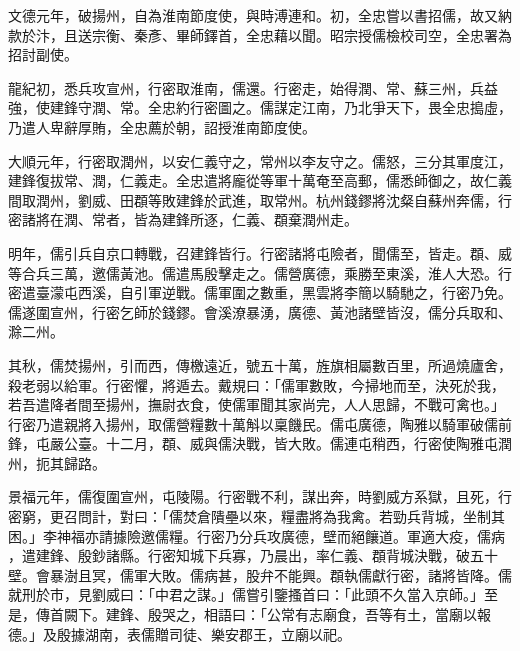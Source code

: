 \begin{pinyinscope}
 文德元年，破揚州，自為淮南節度使，與時溥連和。初，全忠嘗以書招儒，故又納款於汴，且送宗衡、秦彥、畢師鐸首，全忠藉以聞。昭宗授儒檢校司空，全忠署為招討副使。



 龍紀初，悉兵攻宣州，行密取淮南，儒還。行密走，始得潤、常、蘇三州，兵益強，使建鋒守潤、常。全忠約行密圖之。儒謀定江南，乃北爭天下，畏全忠搗虛，乃遣人卑辭厚賄，全忠薦於朝，詔授淮南節度使。



 大順元年，行密取潤州，以安仁義守之，常州以李友守之。儒怒，三分其軍度江，建鋒復拔常、潤，仁義走。全忠遣將龐從等軍十萬奄至高郵，儒悉師御之，故仁義間取潤州，劉威、田頵等敗建鋒於武進，取常州。杭州錢鏐將沈粲自蘇州奔儒，行密諸將在潤、常者，皆為建鋒所逐，仁義、頵棄潤州走。



 明年，儒引兵自京口轉戰，召建鋒皆行。行密諸將屯險者，聞儒至，皆走。頵、威等合兵三萬，邀儒黃池。儒遣馬殷擊走之。儒營廣德，乘勝至東溪，淮人大恐。行密遣臺濛屯西溪，自引軍逆戰。儒軍圍之數重，黑雲將李簡以騎馳之，行密乃免。儒遂圍宣州，行密乞師於錢鏐。會溪潦暴湧，廣德、黃池諸壁皆沒，儒分兵取和、滁二州。



 其秋，儒焚揚州，引而西，傳檄遠近，號五十萬，旌旗相屬數百里，所過燒廬舍，殺老弱以給軍。行密懼，將遁去。戴規曰：「儒軍數敗，今掃地而至，決死於我，若吾遣降者間至揚州，撫尉衣食，使儒軍聞其家尚完，人人思歸，不戰可禽也。」行密乃遣親將入揚州，取儒營糧數十萬斛以稟饑民。儒屯廣德，陶雅以騎軍破儒前鋒，屯嚴公臺。十二月，頵、威與儒決戰，皆大敗。儒連屯稍西，行密使陶雅屯潤州，扼其歸路。


景福元年，儒復圍宣州，屯陵陽。行密戰不利，謀出奔，時劉威方系獄，且死，行密窮，更召問計，對曰：「儒焚倉隤壘以來，糧盡將為我禽。若勁兵背城，坐制其困。」李神福亦請據險邀儒糧。行密乃分兵攻廣德，壁而絕饟道。軍適大疫，儒病
 ，遣建鋒、殷鈔諸縣。行密知城下兵寡，乃晨出，率仁義、頵背城決戰，破五十壁。會暴澍且冥，儒軍大敗。儒病甚，股弁不能興。頵執儒獻行密，諸將皆降。儒就刑於市，見劉威曰：「中君之謀。」儒嘗引鑒搔首曰：「此頭不久當入京師。」至是，傳首闕下。建鋒、殷哭之，相語曰：「公常有志廟食，吾等有土，當廟以報德。」及殷據湖南，表儒贈司徒、樂安郡王，立廟以祀。



\end{pinyinscope}